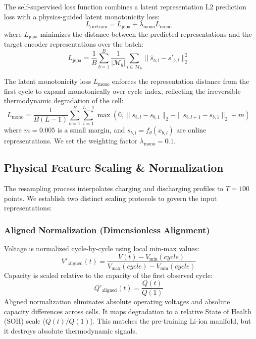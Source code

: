 \documentclass[a4paper,fleqn]{cas-dc}
\begin{document}
The self-supervised loss function combines a latent representation L2 prediction loss with a physics-guided latent monotonicity loss:
\begin{equation}
    L_{\text{pretrain}} = L_{\text{jepa}} + \lambda_{\text{mono}} L_{\text{mono}}
\end{equation}
where $L_{\text{jepa}}$ minimizes the distance between the predicted representations and the target encoder representations over the batch:
\begin{equation}
    L_{\text{jepa}} = \frac{1}{B} \sum_{b=1}^B \frac{1}{|\mathcal{M}_b|} \sum_{l \in \mathcal{M}_b} \| \hat{s}_{b, l} - s'_{b, l} \|_2^2
\end{equation}

The latent monotonicity loss $L_{\text{mono}}$ enforces the representation distance from the first cycle to expand monotonically over cycle index, reflecting the irreversible thermodynamic degradation of the cell:
\begin{equation}
    L_{\text{mono}} = \frac{1}{B(L-1)} \sum_{b=1}^B \sum_{l=1}^{L-1} \max\left(0, \|s_{b, l} - s_{b, 1}\|_2 - \|s_{b, l+1} - s_{b, 1}\|_2 + m\right)
\end{equation}
where $m = 0.005$ is a small margin, and $s_{b, l} = f_\theta(x_{b, l})$ are online representations. We set the weighting factor $\lambda_{\text{mono}} = 0.1$.

\subsection{Physical Feature Scaling \& Normalization}
The resampling process interpolates charging and discharging profiles to $T = 100$ points. We establish two distinct scaling protocols to govern the input representations:

\subsubsection{Aligned Normalization (Dimensionless Alignment)}
Voltage is normalized cycle-by-cycle using local min-max values:
\begin{equation}
    V'_{\text{aligned}}(t) = \frac{V(t) - V_{\min}(cycle)}{V_{\max}(cycle) - V_{\min}(cycle)}
\end{equation}
Capacity is scaled relative to the capacity of the first observed cycle:
\begin{equation}
    Q'_{\text{aligned}}(t) = \frac{Q(t)}{Q(1)}
  \label{eq:aligned_q}
\end{equation}
Aligned normalization eliminates absolute operating voltages and absolute capacity differences across cells. It maps degradation to a relative State of Health (SOH) scale ($Q(t)/Q(1)$). This matches the pre-training Li-ion manifold, but it destroys absolute thermodynamic signals.
\end{document}
